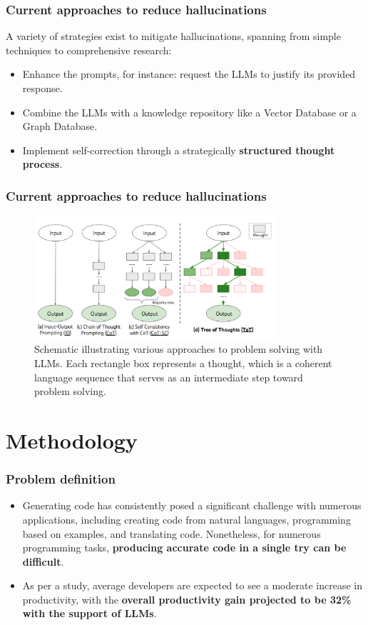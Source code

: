 \documentclass{beamer}
\begin{document}
\begin{frame}[allowframebreaks]
\frametitle{Current approaches to reduce hallucinations}
A variety of strategies exist to mitigate hallucinations, spanning from simple techniques to comprehensive research:
\begin{itemize}
  \item Enhance the prompts, for instance: request the LLMs to justify its provided response.
  \item Combine the LLMs with a knowledge repository like a Vector Database or a Graph Database.~\cite{yao2023exploring}
  \item Implement self-correction through a strategically \textbf{structured thought process}.~\cite{wei2022chain,yao2023tree}
\end{itemize}
\end{frame}

\begin{frame}[allowframebreaks]
\frametitle{Current approaches to reduce hallucinations}
\begin{figure}
  \centering
  \includegraphics[width=0.8\textwidth]{img/chain_of_thoughts.png}
  \caption{Schematic illustrating various approaches to problem solving with LLMs. Each rectangle box represents a thought, which is a coherent language sequence that serves as an intermediate step toward problem solving.~\cite{yao2023tree}}\label{fig:chain_of_thoughts}
\end{figure}
\end{frame}

\section{Methodology}
\begin{frame}[allowframebreaks]
\frametitle{Problem definition}
\begin{itemize}
  \item Generating code has consistently posed a significant challenge with numerous applications, including creating code from natural languages, programming based on examples, and translating code. Nonetheless, for numerous programming tasks, \textbf{producing accurate code in a single try can be difficult}.~\cite{chen2023teaching}
  \item As per a study, average developers are expected to see a moderate increase in productivity, with the \textbf{overall productivity gain projected to be 32\% with the support of LLMs}.~\cite{eloundou2023gpts}
\end{itemize}
\end{frame}
\end{document}
